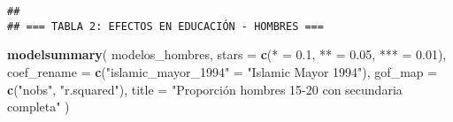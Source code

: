 \documentclass[
]{article}
\newenvironment{Shaded}{\begin{snugshade}}{\end{snugshade}}
\newcommand{\AttributeTok}[1]{\textcolor[rgb]{0.13,0.29,0.53}{#1}}
\newcommand{\FloatTok}[1]{\textcolor[rgb]{0.00,0.00,0.81}{#1}}
\newcommand{\FunctionTok}[1]{\textcolor[rgb]{0.13,0.29,0.53}{\textbf{#1}}}
\newcommand{\NormalTok}[1]{#1}
\newcommand{\OtherTok}[1]{\textcolor[rgb]{0.56,0.35,0.01}{#1}}
\newcommand{\StringTok}[1]{\textcolor[rgb]{0.31,0.60,0.02}{#1}}
\begin{document}
\begin{verbatim}
## 
## === TABLA 2: EFECTOS EN EDUCACIÓN - HOMBRES ===
\end{verbatim}

\begin{Shaded}
\begin{Highlighting}[]
\FunctionTok{modelsummary}\NormalTok{(}
\NormalTok{  modelos\_hombres,}
  \AttributeTok{stars =} \FunctionTok{c}\NormalTok{(}\StringTok{\textquotesingle{}*\textquotesingle{}} \OtherTok{=} \FloatTok{0.1}\NormalTok{, }\StringTok{\textquotesingle{}**\textquotesingle{}} \OtherTok{=} \FloatTok{0.05}\NormalTok{, }\StringTok{\textquotesingle{}***\textquotesingle{}} \OtherTok{=} \FloatTok{0.01}\NormalTok{),}
  \AttributeTok{coef\_rename =} \FunctionTok{c}\NormalTok{(}\StringTok{"islamic\_mayor\_1994"} \OtherTok{=} \StringTok{"Islamic Mayor 1994"}\NormalTok{),}
  \AttributeTok{gof\_map =} \FunctionTok{c}\NormalTok{(}\StringTok{"nobs"}\NormalTok{, }\StringTok{"r.squared"}\NormalTok{),}
  \AttributeTok{title =} \StringTok{"Proporción hombres 15{-}20 con secundaria completa"}
\NormalTok{)}
\end{Highlighting}
\end{Shaded}
\end{document}
